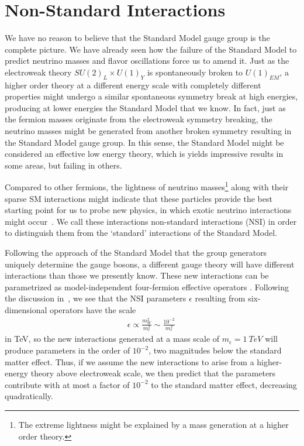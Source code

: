 % 


% 
\section{Non-Standard Interactions}\label{sec:nsiTheory}
We have no reason to believe that the Standard Model 
gauge group is the complete picture. We have already seen how the failure of the Standard Model to predict neutrino masses and flavor 
oscillations force us to amend it. 
Just as the electroweak theory $SU(2)_L \times U(1)_Y$ is 
spontaneously broken to $U(1)_{EM}$, a higher order theory at a different energy scale with completely different
properties might undergo a similar spontaneous symmetry break at high energies, 
producing at lower energies the Standard Model that we know. In fact, 
just as the fermion masses originate from the electroweak symmetry breaking, the neutrino masses might be generated from 
another broken symmetry resulting in the Standard Model gauge group.
In this sense, the Standard Model might be considered 
an effective low energy theory, which is yields impressive results in some areas, but failing in others. 

Compared to other fermions, the lightness of neutrino masses\footnote{The extreme lightness might be explained by a mass generation at a higher order theory.} along with their sparse SM interactions might 
indicate that these particles provide the best starting point for us to probe new physics, in which exotic neutrino interactions might occur~\cite{gavela2009}. We call these interactions non-standard interactions (NSI) in order to 
distinguish them from the `standard' interactions of the Standard Model.
 
Following the approach of the Standard Model that the group generators uniquely determine the gauge bosons, a different gauge
theory will have different interactions than those we presently know. These new interactions can be parametrized as model-independent four-fermion effective operators \cite{salvadoNSI,nsiFarzan}.
Following the discussion in~\cite{tommyNSI}, we see that the NSI parameters $\epsilon$ resulting from six-dimensional operators have the scale
\begin{align}
    \epsilon \propto \frac{m_W^2}{m_{\epsilon}^2} \sim \frac{10^{-2}}{m_\epsilon^2}\,
\end{align} 
in TeV, so the new interactions generated at a mass scale of $m_\epsilon = \SI{1}{TeV}$ will produce parameters in the order of $10^{-2}$, 
two magnitudes below the standard matter effect. Thus, if we assume the new interactions to arise from a higher-energy theory above electroweak scale, 
we then predict that the parameters contribute with at most a factor of $10^{-2}$ to the standard matter effect, decreasing quadratically.


